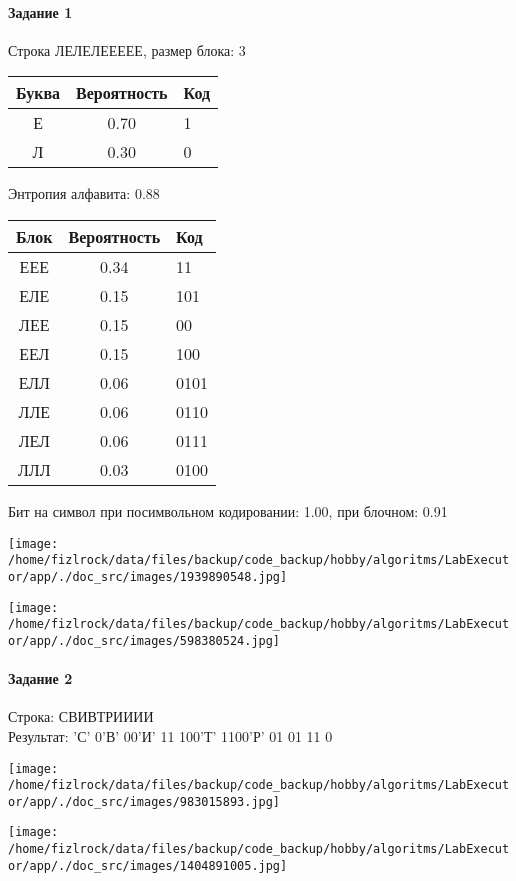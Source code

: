 \documentclass[a4paper, 12pt]{article}
\begin{document}
\paragraph{Задание 1}

Строка ЛЕЛЕЛЕЕЕЕЕ, размер блока: 3
\begin{center}
 \begin{tabular}{ |c|c|l| } 
  \hline
     Буква & Вероятность & Код\\ \hline
Е & 0.70 & 1\\\hline
Л & 0.30 & 0
\\ \hline \end{tabular}
\end{center}
Энтропия алфавита: 0.88
\begin{center}
 \begin{tabular}{ |c|c|l| } 
  \hline
     Блок & Вероятность & Код\\ \hline
ЕЕЕ & 0.34 & 11\\\hline
ЕЛЕ & 0.15 & 101\\\hline
ЛЕЕ & 0.15 & 00\\\hline
ЕЕЛ & 0.15 & 100\\\hline
ЕЛЛ & 0.06 & 0101\\\hline
ЛЛЕ & 0.06 & 0110\\\hline
ЛЕЛ & 0.06 & 0111\\\hline
ЛЛЛ & 0.03 & 0100
\\ \hline \end{tabular}
\end{center}
Бит на символ при посимвольном кодировании: 1.00, при блочном: 0.91

\texttt{[image: /home/fizlrock/data/files/backup/code\_backup/hobby/algoritms/LabExecutor/app/./doc\_src/images/1939890548.jpg]}

\texttt{[image: /home/fizlrock/data/files/backup/code\_backup/hobby/algoritms/LabExecutor/app/./doc\_src/images/598380524.jpg]}
\pagebreak
\paragraph{Задание 2}

Строка: 
СВИВТРИИИИ\\
Результат: 'С' 0'В' 00'И' 11 100'Т' 1100'Р' 01 01 11 0

\texttt{[image: /home/fizlrock/data/files/backup/code\_backup/hobby/algoritms/LabExecutor/app/./doc\_src/images/983015893.jpg]}

\texttt{[image: /home/fizlrock/data/files/backup/code\_backup/hobby/algoritms/LabExecutor/app/./doc\_src/images/1404891005.jpg]}
\end{document}
